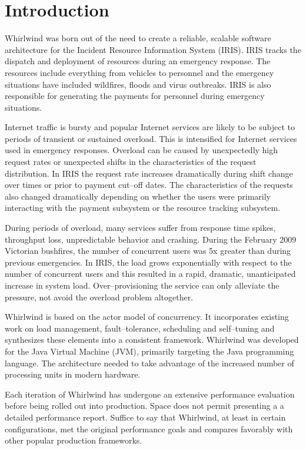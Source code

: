 \documentclass[conference,a4paper,final]{IEEEtran}
\begin{document}
\IEEEpeerreviewmaketitle

\section{Introduction}

Whirlwind was born out of the need to create a reliable, scalable software architecture for the Incident Resource Information System (IRIS). IRIS tracks the dispatch and deployment of resources during an emergency response. The resources include everything from vehicles to personnel and the emergency situations have included wildfires, floods and virus outbreaks. IRIS is also responsible for generating the payments for personnel during emergency situations.

Internet traffic is bursty and popular Internet services are likely to be subject to periods of transient or sustained overload. This is intensified for Internet services used in emergency responses. Overload can be caused by unexpectedly high request rates or unexpected shifts in the characteristics of the request distribution. In IRIS the request rate increases dramatically during shift change over times or prior to payment cut--off dates. The characteristics of the requests also changed dramatically depending on whether the users were primarily interacting with the payment subsystem or the resource tracking subsystem.

During periods of overload, many services suffer from response time spikes, throughput loss, unpredictable behavior and crashing. During the February 2009 Victorian bushfires, the number of concurrent users was 5x greater than during previous emergencies. In IRIS, the load grows exponentially with respect to the number of concurrent users and this resulted in a rapid, dramatic, unanticipated increase in system load. Over--provisioning the service can only alleviate the pressure, not avoid the overload problem altogether. 
 
Whirlwind is based on the actor model of concurrency. It incorporates existing work on load management, fault--tolerance, scheduling and self--tuning and synthesizes these elements into a consistent framework. Whirlwind was developed for the Java Virtual Machine (JVM), primarily targeting the Java programming language. The architecture needed to take advantage of the increased number of processing units in modern hardware.

Each iteration of Whirlwind has undergone an extensive performance evaluation before being rolled out into production. Space does not permit presenting a a detailed performance report. Suffice to say that Whirlwind, at least in certain configurations, met the original performance goals and compares favorably with other popular production frameworks.
\end{document}
